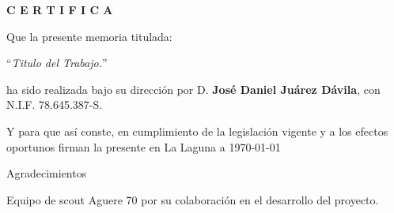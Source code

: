 \documentclass[spanish,a4paper,11pt,twoside]{report}
\begin{document}
\bigskip
\bigskip
\bigskip
\bigskip
\bigskip
{\bf C E R T I F I C A}

\bigskip
\bigskip
\bigskip
Que la presente memoria titulada:

\bigskip
``{\it Titulo del Trabajo.}''

\bigskip
\bigskip
\bigskip

\noindent ha sido realizada bajo su dirección por D. {\bf José Daniel Juárez Dávila},
con N.I.F. 78.645.387-S.

\bigskip
\bigskip

Y para que así conste, en cumplimiento de la legislación vigente y a los efectos
oportunos firman la presente en La Laguna a \today 

\cleardoublepage
\thispagestyle{empty}

{ \flushright

\begin{LARGE}
Agradecimientos
\end{LARGE}

\hspace{3mm}

\begin{large}


\hspace{3mm}
Equipo de scout Aguere 70 por su colaboración en el  desarrollo del proyecto.

\end{large}

}
\end{document}

